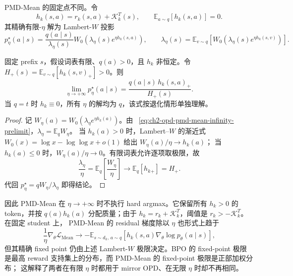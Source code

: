 PMD-Mean 的固定点不同。令
\begin{equation}
h_k(s,a)=r_k(s,a)+\mathcal K_k^T(s),
\qquad \mathbb E_{a\sim q}[h_k(s,a)]=0.
\end{equation}
其精确有限-$\eta$ 解为 Lambert-$W$ 投影
\begin{equation}
p^\star_{\eta}(a\mid s)
=\frac{q(a\mid s)}{\lambda_\eta(s)}
W_0\!\left(\lambda_\eta(s)e^{\eta h_k(s,a)}\right),
\qquad
\lambda_\eta(s)=\mathbb E_{v\sim q}
\left[W_0\!\left(\lambda_\eta(s)e^{\eta h_k(s,v)}\right)\right].
\label{eq:ch2-opd-pmd-mean-infinity-prelimit}
\end{equation}

\begin{proposition}
\label{prop:ch2-opd-pmd-mean-infinity}
固定 prefix $s$，假设词表有限、$q(a)>0$，且 $h_k$ 非恒定。令
$H_+(s)=\mathbb E_{v\sim q}[h_k(s,v)_+]>0$。则
\begin{equation}
\lim_{\eta\to+\infty}p^\star_{\eta}(a\mid s)
=\frac{q(a\mid s)\,h_k(s,a)_+}{H_+(s)}.
\label{eq:ch2-opd-pmd-mean-infinity-target}
\end{equation}
当 $q=t$ 时 $h_k\equiv0$，所有 $\eta$ 的解均为 $q$，该式按退化情形单独理解。
\end{proposition}

\begin{proof}
记 $W_\eta(a)=W_0(\lambda_\eta e^{\eta h_k(a)})$。由
~\eqref{eq:ch2-opd-pmd-mean-infinity-prelimit}，$\lambda_\eta=\mathbb E_qW_\eta$。
当 $h_k(a)>0$ 时，Lambert--$W$ 的渐近式
$W_0(x)=\log x-\log\log x+o(1)$ 给出 $W_\eta(a)/\eta\to h_k(a)$；
当 $h_k(a)\leq0$ 时，$W_\eta(a)/\eta\to0$。有限词表允许逐项取极限，故
\begin{equation}
\frac{\lambda_\eta}{\eta}
=\mathbb E_q\left[\frac{W_\eta}{\eta}\right]
\longrightarrow\mathbb E_q[h_k{}_+]=H_+.
\end{equation}
代回 $p^\star_\eta=qW_\eta/\lambda_\eta$ 即得结论。
\end{proof}

因此 PMD-Mean 在 $\eta\to+\infty$ 时不执行 hard argmax。它保留所有
$h_k>0$ 的 token，并按 $q(a)h_k(a)$ 分配质量；由于
$h_k=r_k+\mathcal K_k^T$，阈值是 $r_k>-\mathcal K_k^T$。在固定 student 上，
PMD-Mean 的 residual 梯度除以 $\eta$ 也形式上趋于
\begin{equation}
\frac1\eta\nabla_\theta\mathcal L_{\mathrm{Mean}}
\longrightarrow
-\mathbb E_{s\sim d_k,\,a\sim q}
\left[h_k(s,a)\nabla_\theta\log p_\theta(a\mid s)\right],
\end{equation}
但其精确 fixed point 仍由上述 Lambert-$W$ 极限决定。BPO 的 fixed-point 极限
是最高 reward 支持集上的分布，而 PMD-Mean 的 fixed-point 极限是正部加权分布；
这解释了两者在有限 $\eta$ 时都用于 mirror OPD、在无限 $\eta$ 时却不再相同。

